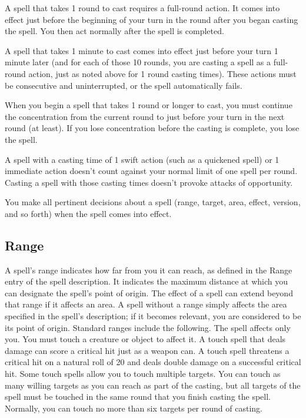 A spell that takes 1 round to cast requires a full-round action. It comes into effect just before the beginning of your turn in the round after you began casting the spell. You then act normally after the spell is completed.

A spell that takes 1 minute to cast comes into effect just before your turn 1 minute later (and for each of those 10 rounds, you are casting a spell as a full-round action, just as noted above for 1 round casting times). These actions must be consecutive and uninterrupted, or the spell automatically fails.

When you begin a spell that takes 1 round or longer to cast, you must continue the concentration from the current round to just before your turn in the next round (at least). If you lose concentration before the casting is complete, you lose the spell.

A spell with a casting time of 1 swift action (such as a quickened spell) or 1 immediate action doesn't count against your normal limit of one spell per round. Casting a spell with those casting times doesn't provoke attacks of opportunity.

You make all pertinent decisions about a spell (range, target, area, effect, version, and so forth) when the spell comes into effect.

\subsection{Range}
A spell's range indicates how far from you it can reach, as defined in the Range entry of the spell description. It indicates the maximum distance at which you can designate the spell's point of origin. The effect of a spell can extend beyond that range if it affects an area. A spell without a range simply affects the area specified in the spell's description; if it becomes relevant, you are considered to be its point of origin. Standard ranges include the following.
 The spell affects only you.
 You must touch a creature or object to affect it. A touch spell that deals damage can score a critical hit just as a weapon can. A touch spell threatens a critical hit on a natural roll of 20 and deals double damage on a successful critical hit. Some touch spells allow you to touch multiple targets. You can touch as many willing targets as you can reach as part of the casting, but all targets of the spell must be touched in the same round that you finish casting the spell. Normally, you can touch no more than six targets per round of casting.

